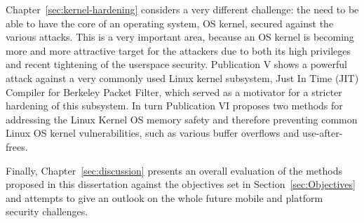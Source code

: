 Chapter~\ref{sec:kernel-hardening} considers a very different challenge: the need to be able to have the core of an operating system, OS kernel, secured against the various attacks. This is a very important area, because an OS kernel is becoming more and more attractive target for the attackers due to both its high privileges and recent tightening of the userspace security. Publication V shows a powerful attack against a very commonly used Linux kernel subsystem, Just In Time (JIT) Compiler for Berkeley Packet Filter, which served as a motivator for a stricter hardening of this subsystem. In turn Publication VI proposes two methods for addressing the Linux Kernel OS memory safety and therefore preventing common Linux OS kernel vulnerabilities, such as various buffer overflows and use-after-frees. 

Finally, Chapter~\ref{sec:discussion} presents an overall evaluation of the methods proposed in this dissertation against the objectives set in Section~\ref{sec:Objectives} and attempts to give an outlook on the whole future mobile and platform security challenges. 

